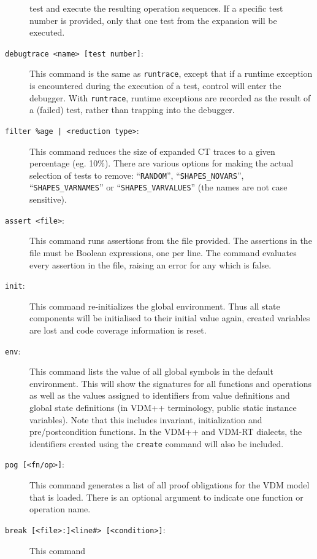 \documentclass{overturerepchap}
\begin{document}
\begin{description}
  test and execute the resulting
  operation sequences. If a specific test number is provided, only
  that one test from the expansion will be executed. 
\item[\texttt{debugtrace <name> [test number]}:] This command is the same as
  \texttt{runtrace}, except that if a runtime exception is encountered during
  the execution of a test, control will enter the debugger. With \texttt{runtrace},
  runtime exceptions are recorded as the result of a (failed) test, rather than
  trapping into the debugger.
\item[\texttt{filter \%age | <reduction type>}:] This command reduces
  the size of expanded CT traces to a given percentage (eg. 10\%).
  There are various options for making the actual selection of tests to remove:
  ``\texttt{RANDOM}'', ``\texttt{SHAPES\_NOVARS}'', ``\texttt{SHAPES\_VARNAMES}''
   or ``\texttt{SHAPES\_VARVALUES}'' (the names are not case sensitive).
\item[\texttt{assert <file>}:] This command runs assertions from the
  file provided. The assertions in the file must be Boolean
  expressions, one per line. The command evaluates every assertion in
  the file, raising an error for any which is false.  
\item[\texttt{init}:] This command re-initializes the global
  environment. Thus all state components will be initialised to their
  initial value again, created variables are lost and code coverage information
  is reset. 
\item[\texttt{env}:] This command lists the value of all global symbols
  in the default environment. This will show the signatures for all
  functions and operations as well as the values assigned to
  identifiers from value definitions and global state definitions (in VDM++
  terminology, public static instance variables). Note that this includes invariant,
  initialization and pre/postcondition functions. In the VDM++ and
  VDM-RT dialects, the identifiers created using the \texttt{create}
  command will also be included. 
\item[\texttt{pog [<fn/op>]}:] This command generates a list of all proof
  obligations for the VDM model that is loaded. There is an optional argument
  to indicate one function or operation name.  
\item[\texttt{break [<file>:]<line\#> [<condition>]}:] This command

\end{description}
\end{document}
